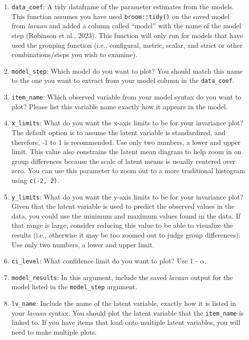 \documentclass[
  man]{apa7}
\begin{document}
\begin{enumerate}
\def\labelenumi{\arabic{enumi})}
\item
  \texttt{data\_coef}: A tidy dataframe of the parameter estimates from the models. This function assumes you have used \texttt{broom::tidy()} on the saved model from \emph{lavaan} and added a column called ``model'' with the name of the model step (Robinson et al., 2023). This function will only run for models that have used the grouping function (i.e., configural, metric, scalar, and strict or other combinations/steps you wish to examine).
\item
  \texttt{model\_step}: Which model do you want to plot? You should match this name to the one you want to extract from your model column in the \texttt{data\_coef}.
\item
  \texttt{item\_name}: Which observed variable from your model syntax do you want to plot? Please list this variable name exactly how it appears in the model.
\item
  \texttt{x\_limits}: What do you want the x-axis limits to be for your invariance plot? The default option is to assume the latent variable is standardized, and therefore, -1 to 1 is recommended. Use only two numbers, a lower and upper limit. This value also constrains the latent mean diagram to help zoom in on group differences because the scale of latent means is usually centered over zero. You can use this parameter to zoom out to a more traditional histogram using \texttt{c(-2,\ 2)}.
\item
  \texttt{y\_limits}: What do you want the y-axis limits to be for your invariance plot? Given that the latent variable is used to predict the observed values in the data, you could use the minimum and maximum values found in the data. If that range is large, consider reducing this value to be able to visualize the results (i.e., otherwise it may be too zoomed out to judge group differences). Use only two numbers, a lower and upper limit.
\item
  \texttt{ci\_level}: What confidence limit do you want to plot? Use 1 - \(\alpha\).
\item
  \texttt{model\_results}: In this argument, include the saved \emph{lavaan} output for the model listed in the \texttt{model\_step} argument.
\item
  \texttt{lv\_name}: Include the name of the latent variable, exactly how it is listed in your \emph{lavaan} syntax. You should plot the latent variable that the \texttt{item\_name} is linked to. If you have items that load onto multiple latent variables, you will need to make multiple plots.
\end{enumerate}
\end{document}
